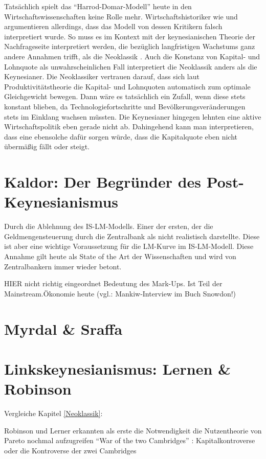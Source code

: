 Tatsächlich spielt das "`Harrod-Domar-Modell"' heute in den Wirtschaftswissenschaften keine Rolle mehr. Wirtschaftshistoriker wie \textcite{Berg2013} und \textcite{Boianovsky2018} argumentieren allerdings, dass das Modell von dessen Kritikern falsch interpretiert wurde. So muss es im Kontext mit der keynesianischen Theorie der Nachfrageseite interpretiert werden, die bezüglich langfristigen Wachstums ganz andere Annahmen trifft, als die Neoklassik \parencite[S. 479]{Boianovsky2018}. Auch die Konstanz von Kapital- und Lohnquote als unwahrscheinlichen Fall interpretiert die Neoklassik anders als die Keynesianer. Die Neoklassiker vertrauen darauf, dass sich laut Produktivitätstheorie die Kapital- und Lohnquoten automatisch zum optimale Gleichgewicht bewegen. Dann wäre es tatsächlich ein Zufall, wenn diese stets konstant blieben, da Technologiefortschritte und Bevölkerungsveränderungen stets im Einklang wachsen müssten. Die Keynesianer hingegen lehnten eine aktive Wirtschaftspolitik eben gerade nicht ab. Dahingehend kann man interpretieren, dass eine ebensolche dafür sorgen würde, dass die Kapitalquote eben nicht übermäßig fällt oder steigt.



\section{Kaldor: Der Begründer des Post-Keynesianismus}
Durch die Ablehnung des IS-LM-Modells.
Einer der ersten, der die Geldmengensteuerung durch die Zentralbank als nicht realistisch darstellte. Diese ist aber eine wichtige Voraussetzung für die LM-Kurve im IS-LM-Modell. Diese Annahme gilt heute als State of the Art der Wissenschaften und wird von Zentralbankern immer wieder betont.

HIER nicht richtig eingeordnet
Bedeutung des Mark-Ups. Ist Teil der Mainstream.Ökonomie heute (vgl.: Mankiw-Interview im Buch Snowdon!)


\section{Myrdal \& Sraffa}

\section{Linkskeynesianismus: Lernen \& Robinson}

Vergleiche Kapitel \ref{Neoklassik}:

Robinson und Lerner erkannten als erste die Notwendigkeit die Nutzentheorie von Pareto nochmal aufzugreifen
"`War of the two Cambridges"' \parencite{Tobin1985}: Kapitalkontroverse oder die Kontroverse der zwei Cambridges


